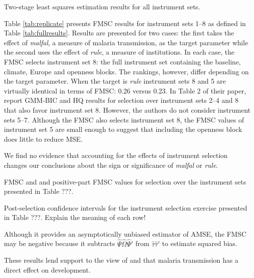 \begin{table}[h]
\centering

\caption{Two-stage least squares estimation results for all instrument sets.}
\label{tab:fullresults}

\end{table}


Table \ref{tab:replicate} presents FMSC results for instrument sets 1--8  as defined in Table \ref{tab:fullresults}. Results are presented for two cases: the first takes the effect of \emph{malfal}, a measure of malaria transmission, as the target parameter while the second uses the effect of \emph{rule}, a measure of institutions. 
In each case, the FMSC selects instrument set 8: the full instrument set containing the baseline, climate, Europe and openness blocks. 
The rankings, however, differ depending on the target parameter.  
When the target is \emph{rule} instrument sets 8 and 5 are virtually identical in terms of FMSC: 0.26 versus 0.23. 
In Table 2 of their paper, \cite{Carstensen2006} report GMM-BIC and HQ results for selection over instrument sets 2--4 and 8 that also favor instrument set 8. 
However, the authors do not consider instrument sets 5--7. 
Although the FMSC also selects instrument set 8, the FMSC values of instrument set 5 are small enough to suggest that including the openness block does little to reduce MSE.


We find no evidence that accounting for the effects of instrument selection changes our conclusions about the sign or significance of \emph{malfal} or \emph{rule}.

\begin{table}[htbp]
	\centering
	
		\caption{FMSC and and positive-part FMSC values for selection over the instrument sets presented in Table ???.}
\end{table}

\begin{table}[htbp]
	\centering
	
	\caption{Post-selection confidence intervals for the instrument selection exercise presented in Table ???. Explain the meaning of each row!}
\end{table}


Although it provides an asymptotically unbiased estimator of AMSE, the FMSC may be negative because it subtracts $\widehat{\Psi}\widehat{\Omega}\widehat{\Psi}'$ from $\widehat{\tau}\widehat{\tau}'$ to estimate squared bias.

These results lend support to the view of \cite{Carstensen2006} and \cite{Sachs} that malaria transmission has a direct effect on development.